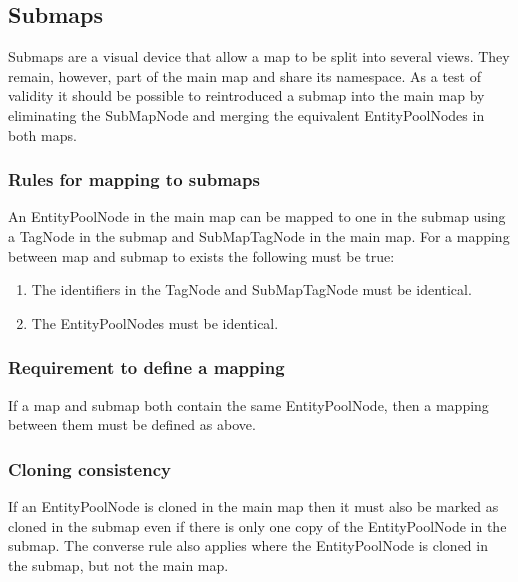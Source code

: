 \subsection{Submaps}

Submaps are a visual device that allow a map to be split into several
views. They remain, however, part of the main map and share its
namespace. As a test of validity it should be possible to reintroduced
a submap into the main map by eliminating the SubMapNode and merging
the equivalent EntityPoolNodes in both maps.

\subsubsection{Rules for mapping to submaps}

An EntityPoolNode in the main map can be mapped to one in the submap
using a TagNode in the submap and SubMapTagNode in the main map. For a
mapping between map and submap to exists the following must be true:

\begin{enumerate}
\item The identifiers in the TagNode and SubMapTagNode must be identical.
\item The EntityPoolNodes must be identical.
\end{enumerate}

\subsubsection{Requirement to define a mapping}

If a map and submap both contain the same EntityPoolNode, then a
mapping between them must be defined as above.

\subsubsection{Cloning consistency}

If an EntityPoolNode is cloned in the main map then it must also be
marked as cloned in the submap even if there is only one copy of the
EntityPoolNode in the submap. The converse rule also applies where the
EntityPoolNode is cloned in the submap, but not the main map.
